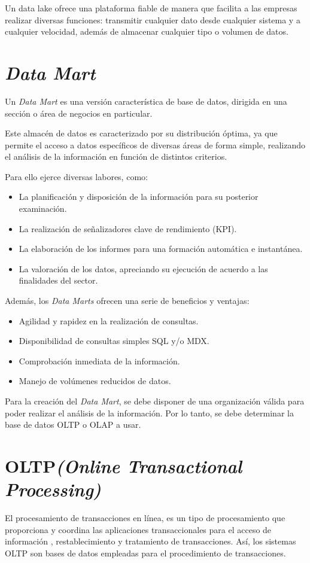 Un data lake ofrece una plataforma fiable de manera que facilita a las empresas realizar diversas funciones: transmitir cualquier dato desde cualquier sistema y a cualquier velocidad, además de almacenar cualquier tipo o volumen de datos.

\section{\emph{Data Mart}}
Un \emph{Data Mart} \cite{Data_Mart} es una versión característica de base de datos, dirigida en una sección o área de negocios en particular.

Este almacén de datos es caracterizado por su distribución óptima, ya que permite el acceso a datos específicos de diversas áreas de forma simple, realizando el análisis de la información en función de distintos criterios.

Para ello ejerce diversas labores, como:
\begin{itemize}
	\item La planificación y disposición de la información para su posterior examinación.
	\item La realización de señalizadores clave de rendimiento (KPI).
	\item La elaboración de los informes para una formación automática e instantánea.
	\item La valoración de los datos, apreciando su ejecución de acuerdo a las finalidades del sector.
\end{itemize}

Además, los \emph{Data Marts} ofrecen una serie de beneficios y ventajas:
\begin{itemize}
	\item Agilidad y rapidez en la realización de consultas.
	\item Disponibilidad de consultas simples SQL y/o MDX.
	\item Comprobación inmediata de la información.
	\item Manejo de volúmenes reducidos de datos.
\end{itemize}


Para la creación del \emph{Data Mart}, se debe disponer de una organización válida para poder realizar el análisis de la información. Por lo tanto, se debe determinar la base de datos OLTP o OLAP a usar.


\section{OLTP\emph{(Online Transactional Processing)}}
El procesamiento de transacciones en línea, es un tipo de procesamiento que proporciona y coordina las aplicaciones transaccionales para el acceso de información , restablecimiento y tratamiento de transacciones. Así, los sistemas OLTP son bases de datos empleadas para el procedimiento de transacciones.

